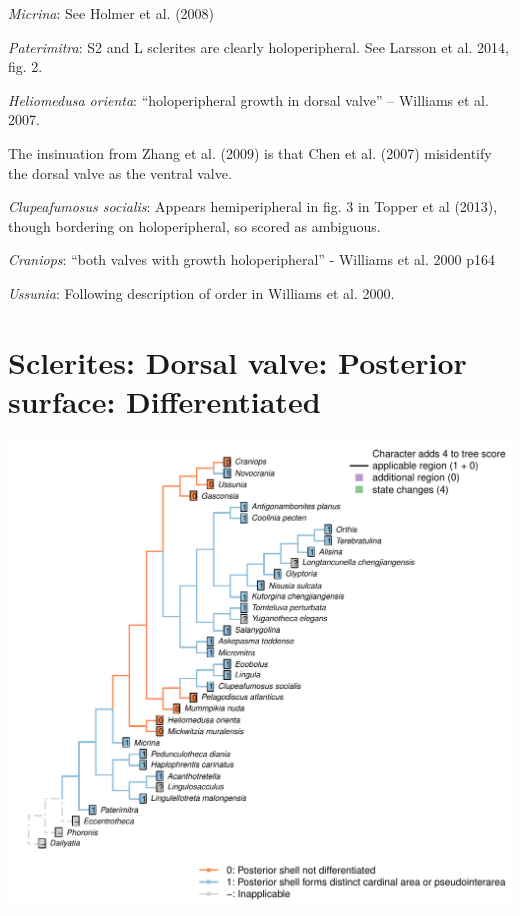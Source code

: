 \documentclass[]{book}
\theoremstyle{definition}
\theoremstyle{definition}
\theoremstyle{definition}
\theoremstyle{remark}
\begin{document}
\emph{Micrina}: See Holmer et al. (2008)

\emph{Paterimitra}: S2 and L sclerites are clearly holoperipheral. See
Larsson et al. 2014, fig. 2.

\emph{Heliomedusa orienta}: ``holoperipheral growth in dorsal valve'' --
Williams et al. 2007.

The insinuation from Zhang et al. (2009) is that Chen et al. (2007)
misidentify the dorsal valve as the ventral valve.

\emph{Clupeafumosus socialis}: Appears hemiperipheral in fig. 3 in
Topper et al (2013), though bordering on holoperipheral, so scored as
ambiguous.

\emph{Craniops}: ``both valves with growth holoperipheral'' - Williams
et al. 2000 p164

\emph{Ussunia}: Following description of order in Williams et al. 2000.

\hypertarget{sclerites-dorsal-valve-posterior-surface-differentiated}{%
\section*{Sclerites: Dorsal valve: Posterior surface:
Differentiated}\label{sclerites-dorsal-valve-posterior-surface-differentiated}}

\includegraphics{Brachiopod_phylogeny_files/figure-latex/unnamed-chunk-5-20.pdf}
\end{document}
